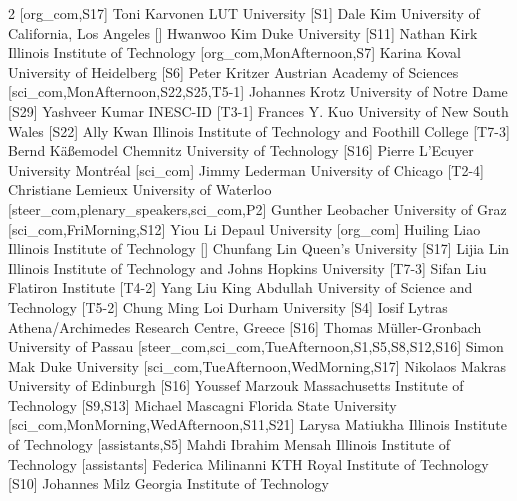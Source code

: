 \begin{multicols}{2}
  [org_com,S17]
\participantne
  {Toni Karvonen}
  {LUT University}
  [S1]
\participantne
  {Dale Kim}
  {University of California, Los Angeles}
  []
\participantne
  {Hwanwoo Kim}
  {Duke University}
  [S11]
\participantne
  {Nathan Kirk}
  {Illinois Institute of Technology}
  [org_com,MonAfternoon,S7]
\participantne
  {Karina Koval}
  {University of Heidelberg}
  [S6]
\participantne
  {Peter Kritzer}
  {Austrian Academy of Sciences}
  [sci_com,MonAfternoon,S22,S25,T5-1]
\participantne
  {Johannes Krotz}
  {University of Notre Dame}
  [S29]
\participantne
  {Yashveer Kumar}
  {INESC-ID}
  [T3-1]
\participantne
  {Frances Y. Kuo}
  {University of New South Wales}
  [S22]
\participantne
  {Ally Kwan}
  {Illinois Institute of Technology and Foothill College}
  [T7-3]
\participantne
  {Bernd K\"a{\ss}emodel}
  {Chemnitz University of Technology}
  [S16]
\participantne
  {Pierre L'Ecuyer}
  {University Montr\'eal}
  [sci_com]
\participantne
  {Jimmy Lederman}
  {University of Chicago}
  [T2-4]
\participantne
  {Christiane Lemieux}
  {University of Waterloo}
  [steer_com,plenary_speakers,sci_com,P2]
\participantne
  {Gunther Leobacher}
  {University of Graz}
  [sci_com,FriMorning,S12]
\participantne
  {Yiou Li}
  {Depaul University}
  [org_com]
\participantne
  {Huiling Liao}
  {Illinois Institute of Technology}
  []
\participantne
  {Chunfang Lin}
  {Queen's University}
  [S17]
\participantne
  {Lijia Lin}
  {Illinois Institute of Technology and Johns Hopkins University}
  [T7-3]
\participantne
  {Sifan Liu}
  {Flatiron Institute}
  [T4-2]
\participantne
  {Yang Liu}
  {King Abdullah University of Science and Technology}
  [T5-2]
\participantne
  {Chung Ming Loi}
  {Durham University}
  [S4]
\participantne
  {Iosif Lytras}
  {Athena/Archimedes Research Centre, Greece}
  [S16]
\participantne
  {Thomas M\"uller-Gronbach}
  {University of Passau}
  [steer_com,sci_com,TueAfternoon,S1,S5,S8,S12,S16]
\participantne
  {Simon Mak}
  {Duke University}
  [sci_com,TueAfternoon,WedMorning,S17]
\participantne
  {Nikolaos Makras}
  {University of Edinburgh}
  [S16]
\participantne
  {Youssef Marzouk}
  {Massachusetts Institute of Technology}
  [S9,S13]
\participantne
  {Michael Mascagni}
  {Florida State University}
  [sci_com,MonMorning,WedAfternoon,S11,S21]
\participantne
  {Larysa Matiukha}
  {Illinois Institute of Technology}
  [assistants,S5]
\participantne
  {Mahdi Ibrahim Mensah}
  {Illinois Institute of Technology}
  [assistants]
\participantne
  {Federica Milinanni}
  {KTH Royal Institute of Technology}
  [S10]
\participantne
  {Johannes Milz}
  {Georgia Institute of Technology}

\end{multicols}
